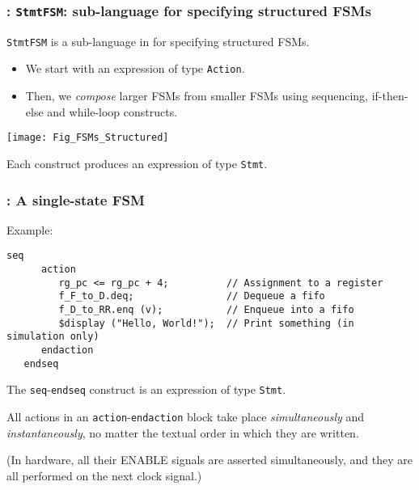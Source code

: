 
\begin{frame}[fragile]
\frametitle{{\BSV}: {\tt StmtFSM}: sub-language for specifying structured FSMs}

\footnotesize

{\tt StmtFSM} is a sub-language in {\BSV} for specifying structured FSMs.
\begin{itemize}

 \item We start with an expression of type {\tt Action}.

 \item Then, we \emph{compose} larger FSMs from smaller FSMs using
       sequencing, if-then-else and while-loop constructs.

\end{itemize}

\vspace{2ex}

\begin{center}
\texttt{[image: Fig\_FSMs\_Structured]}
\end{center}

\vspace{2ex}

Each construct produces an expression of type {\tt Stmt}.

\end{frame}


\begin{frame}[fragile]
\frametitle{{\BSV}: A single-state FSM}

\footnotesize

Example:

\vspace{2ex}

\begin{Verbatim}[frame=single]
   seq
      action
         rg_pc <= rg_pc + 4;          // Assignment to a register
         f_F_to_D.deq;                // Dequeue a fifo
         f_D_to_RR.enq (v);           // Enqueue into a fifo
         $display ("Hello, World!");  // Print something (in simulation only)
      endaction
   endseq
\end{Verbatim}

\vspace{2ex}

The {\tt seq}-{\tt endseq} construct is an expression of type {\tt Stmt}.

\vspace{4ex}

All actions in an {\tt action}-{\tt endaction} block take
place \emph{simultaneously} and \emph{instantaneously}, no matter the
textual order in which they are written.

\vspace{1ex}

(In hardware, all their ENABLE signals are asserted simultaneously,
and they are all performed on the next clock signal.)

\end{frame}

